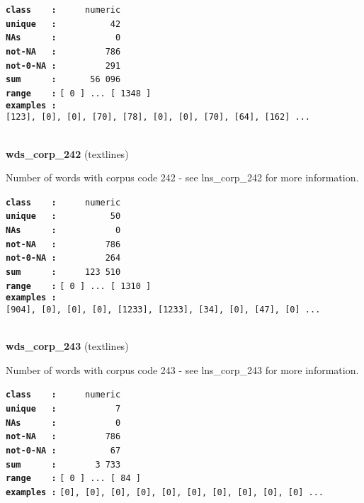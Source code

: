 \documentclass[]{article}
\begin{document}
\textbf{\texttt{class\ \ \ \ :}} \texttt{~~~~~numeric}\\
\textbf{\texttt{unique\ \ \ :}} \texttt{~~~~~~~~~~42}\\
\textbf{\texttt{NAs\ \ \ \ \ \ :}} \texttt{~~~~~~~~~~~0}\\
\textbf{\texttt{not-NA\ \ \ :}} \texttt{~~~~~~~~~786}\\
\textbf{\texttt{not-0-NA\ :}} \texttt{~~~~~~~~~291}\\
\textbf{\texttt{sum\ \ \ \ \ \ :}} \texttt{~~~~~~56~096}\\
\textbf{\texttt{range\ \ \ \ :}}
\texttt{{[}\ 0\ {]}\ ...\ {[}\ 1348\ {]}}\\
\textbf{\texttt{examples\ :}}
\texttt{{[}123{]},\ {[}0{]},\ {[}0{]},\ {[}70{]},\ {[}78{]},\ {[}0{]},\ {[}0{]},\ {[}70{]},\ {[}64{]},\ {[}162{]}\ ...}\\

~

\textbf{wds\_corp\_242} (textlines)

Number of words with corpus code 242 - see lns\_corp\_242 for more
information.

\textbf{\texttt{class\ \ \ \ :}} \texttt{~~~~~numeric}\\
\textbf{\texttt{unique\ \ \ :}} \texttt{~~~~~~~~~~50}\\
\textbf{\texttt{NAs\ \ \ \ \ \ :}} \texttt{~~~~~~~~~~~0}\\
\textbf{\texttt{not-NA\ \ \ :}} \texttt{~~~~~~~~~786}\\
\textbf{\texttt{not-0-NA\ :}} \texttt{~~~~~~~~~264}\\
\textbf{\texttt{sum\ \ \ \ \ \ :}} \texttt{~~~~~123~510}\\
\textbf{\texttt{range\ \ \ \ :}}
\texttt{{[}\ 0\ {]}\ ...\ {[}\ 1310\ {]}}\\
\textbf{\texttt{examples\ :}}
\texttt{{[}904{]},\ {[}0{]},\ {[}0{]},\ {[}0{]},\ {[}1233{]},\ {[}1233{]},\ {[}34{]},\ {[}0{]},\ {[}47{]},\ {[}0{]}\ ...}\\

~

\textbf{wds\_corp\_243} (textlines)

Number of words with corpus code 243 - see lns\_corp\_243 for more
information.

\textbf{\texttt{class\ \ \ \ :}} \texttt{~~~~~numeric}\\
\textbf{\texttt{unique\ \ \ :}} \texttt{~~~~~~~~~~~7}\\
\textbf{\texttt{NAs\ \ \ \ \ \ :}} \texttt{~~~~~~~~~~~0}\\
\textbf{\texttt{not-NA\ \ \ :}} \texttt{~~~~~~~~~786}\\
\textbf{\texttt{not-0-NA\ :}} \texttt{~~~~~~~~~~67}\\
\textbf{\texttt{sum\ \ \ \ \ \ :}} \texttt{~~~~~~~3~733}\\
\textbf{\texttt{range\ \ \ \ :}}
\texttt{{[}\ 0\ {]}\ ...\ {[}\ 84\ {]}}\\
\textbf{\texttt{examples\ :}}
\texttt{{[}0{]},\ {[}0{]},\ {[}0{]},\ {[}0{]},\ {[}0{]},\ {[}0{]},\ {[}0{]},\ {[}0{]},\ {[}0{]},\ {[}0{]}\ ...}\\
\end{document}
